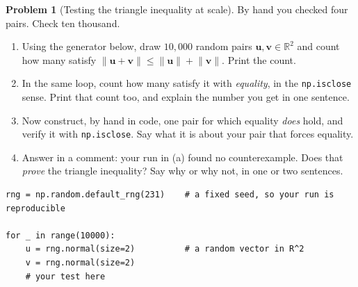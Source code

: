 \documentclass[11pt]{article}
\theoremstyle{definition}
\newtheorem{prob}{Problem}[section]
\newcommand{\R}{\mathbb{R}}
\newcommand{\vc}[1]{\mathbf{#1}}
\newcommand{\norm}[1]{\lVert #1\rVert}
\begin{document}
\begin{prob}[Testing the triangle inequality at scale]
By hand you checked four pairs. Check ten thousand.

\begin{enumerate}[label=\textbf{(\alph*)},leftmargin=2.6em,itemsep=7pt,topsep=6pt]
  \item Using the generator below, draw $10{,}000$ random pairs
        $\vc{u},\vc{v}\in\R^{2}$ and count how many satisfy
        $\norm{\vc{u}+\vc{v}}\le\norm{\vc{u}}+\norm{\vc{v}}$. Print the count.
  \item In the same loop, count how many satisfy it with \emph{equality}, in the
        \texttt{np.isclose} sense. Print that count too, and explain the number
        you get in one sentence.
  \item Now construct, by hand in code, one pair for which equality \emph{does}
        hold, and verify it with \texttt{np.isclose}. Say what it is about your
        pair that forces equality.
  \item Answer in a comment: your run in (a) found no counterexample. Does that
        \emph{prove} the triangle inequality? Say why or why not, in one or two
        sentences.
\end{enumerate}

\begin{lstlisting}
rng = np.random.default_rng(231)    # a fixed seed, so your run is reproducible

for _ in range(10000):
    u = rng.normal(size=2)          # a random vector in R^2
    v = rng.normal(size=2)
    # your test here
\end{lstlisting}
\end{prob}
\end{document}
